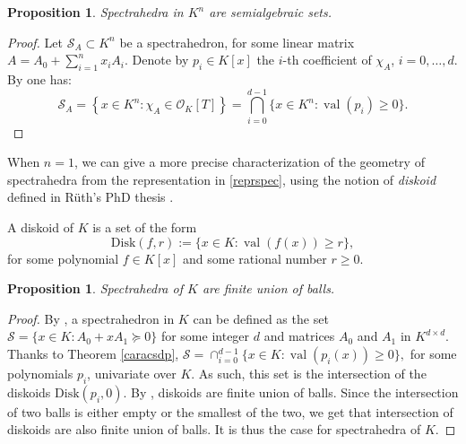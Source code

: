 \documentclass{elsarticle}
\theoremstyle{plain}
\newtheorem{proposition}[theorem]{Proposition}
\theoremstyle{definition}
\DeclareMathOperator{\val}{val}
\newcommand{\OK}{\mathcal{O}_K}
\begin{document}
\begin{proposition}
  Spectrahedra in $K^n$ are semialgebraic sets. 
\end{proposition}
\begin{proof}
  Let $\mathcal{S}_A \subset K^n$ be a spectrahedron,
  for some linear matrix $A = A_0+\sum_{i=1}^n x_i A_i$. 
  Denote by $p_i \in K[x]$ the $i$-th coefficient of $\chi_{A}$, $i=0,\ldots,d$.
  By  one has:
  \begin{equation}\label{reprspec}
    \mathcal{S}_A
    = \left\{x \in K^n : \chi_{A} \in \OK[T]\right\}
  = \bigcap_{i=0}^{d-1} \{x \in K^n : \val(p_i) \geq 0\}.
  \end{equation}
\end{proof}


When $n=1$, we can give a more precise characterization of the geometry of spectrahedra
from the representation in \eqref{reprspec}, using the notion of \emph{diskoid} defined
in Rüth's PhD thesis \cite{ruth_models_2015}.

\begin{definition}
A diskoid of $K$ is a set of the form
\[  \mathrm{Disk}(f,r):= \{ x \in K : \val(f(x)) \geq r \},\]
for some polynomial $f \in K[x]$ and some rational number $r \geq 0.$
\end{definition}

\begin{proposition}
Spectrahedra of $K$ are finite union of balls. \label{prop_spectrahedra_dim1_are_diskoids}
\end{proposition}
\begin{proof}
By , a spectrahedron in $K$ 
can be defined as the set $\mathcal{S}=\{x \in K : A_0+x A_1 \succeq 0\}$
for some integer $d$ and matrices $A_0$ and $A_1$ in $K^{d \times d}$.
Thanks to Theorem \ref{caracsdp},
$\mathcal{S}=\cap_{i=0}^{d-1} \{x \in K : \val(p_i(x)) \geq 0\},$
for some polynomials $p_i$, univariate over $K$.
As such, this set is the intersection of the diskoids
$\mathrm{Disk}(p_i,0).$
By \cite[Lemma 6.9]{ABL_2021}, diskoids are finite union of balls.
Since the intersection of two balls is either empty
or the smallest of the two, we get that intersection of diskoids
are also finite union of balls.
It is thus the case for spectrahedra of $K$.
\end{proof}
\end{document}
